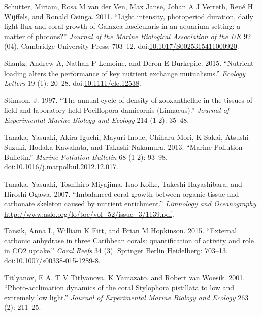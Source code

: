 \documentclass[]{elsarticle} %
\begin{document}
\hypertarget{ref-Schutter:2011ie}{}
Schutter, Miriam, Rosa M van der Ven, Max Janse, Johan A J Verreth, René
H Wijffels, and Ronald Osinga. 2011. ``Light intensity, photoperiod
duration, daily light flux and coral growth of Galaxea fascicularis in
an aquarium setting: a matter of photons?'' \emph{Journal of the Marine
Biological Association of the UK} 92 (04). Cambridge University Press:
703--12.
doi:\href{https://doi.org/10.1017/S0025315411000920}{10.1017/S0025315411000920}.

\hypertarget{ref-Shantz:2015dz}{}
Shantz, Andrew A, Nathan P Lemoine, and Deron E Burkepile. 2015.
``Nutrient loading alters the performance of key nutrient exchange
mutualisms.'' \emph{Ecology Letters} 19 (1): 20--28.
doi:\href{https://doi.org/10.1111/ele.12538}{10.1111/ele.12538}.

\hypertarget{ref-Stimson:1997p3837}{}
Stimson, J. 1997. ``The annual cycle of density of zooxanthellae in the
tissues of field and laboratory-held Pocillopora damicornis
(Linnaeus).'' \emph{Journal of Experimental Marine Biology and Ecology}
214 (1-2): 35--48.

\hypertarget{ref-Tanaka:2013dj}{}
Tanaka, Yasuaki, Akira Iguchi, Mayuri Inoue, Chiharu Mori, K Sakai,
Atsushi Suzuki, Hodaka Kawahata, and Takashi Nakamura. 2013. ``Marine
Pollution Bulletin.'' \emph{Marine Pollution Bulletin} 68 (1-2): 93--98.
doi:\href{https://doi.org/10.1016/j.marpolbul.2012.12.017}{10.1016/j.marpolbul.2012.12.017}.

\hypertarget{ref-Tanaka:2007uv}{}
Tanaka, Yasuaki, Toshihiro Miyajima, Isao Koike, Takeshi Hayashibara,
and Hiroshi Ogawa. 2007. ``Imbalanced coral growth between organic
tissue and carbonate skeleton caused by nutrient enrichment.''
\emph{Limnology and Oceanography}.
\url{http://www.aslo.org/lo/toc/vol_52/issue_3/1139.pdf}.

\hypertarget{ref-Tansik:2015cm}{}
Tansik, Anna L, William K Fitt, and Brian M Hopkinson. 2015. ``External
carbonic anhydrase in three Caribbean corals: quantification of activity
and role in CO2 uptake.'' \emph{Coral Reefs} 34 (3). Springer Berlin
Heidelberg: 703--13.
doi:\href{https://doi.org/10.1007/s00338-015-1289-8}{10.1007/s00338-015-1289-8}.

\hypertarget{ref-Titlyanov:2001p3631}{}
Titlyanov, E A, T V Titlyanova, K Yamazato, and Robert van Woesik. 2001.
``Photo-acclimation dynamics of the coral Stylophora pistillata to low
and extremely low light.'' \emph{Journal of Experimental Marine Biology
and Ecology} 263 (2): 211--25.
\end{document}
